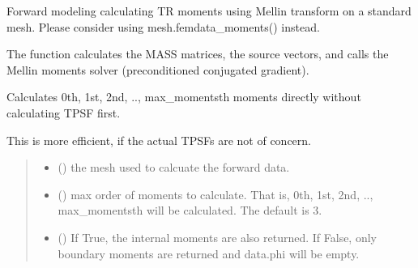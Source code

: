 \documentclass[letterpaper,10pt,english]{sphinxmanual}
\begin{document}
\begin{fulllineitems}
\label{\detokenize{_autosummary/nirfasterff.forward.femdata.femdata_stnd_TR_moments:nirfasterff.forward.femdata.femdata_stnd_TR_moments}}
\pysigstartsignatures
{}
\pysigstopsignatures
\sphinxAtStartPar
Forward modeling calculating TR moments using Mellin transform on a standard mesh. Please consider using mesh.femdata\_moments() instead.

\sphinxAtStartPar
The function calculates the MASS matrices, the source vectors, and calls the Mellin moments solver (preconditioned conjugated gradient).

\sphinxAtStartPar
Calculates 0th, 1st, 2nd, .., max\_moments\sphinxhyphen{}th moments directly without calculating TPSF first.

\sphinxAtStartPar
This is more efficient, if the actual TPSFs are not of concern.
\begin{quote}\begin{description}
\begin{itemize}
\item {} 
\sphinxAtStartPar
{} () \textendash{} the mesh used to calcuate the forward data.

\item {} 
\sphinxAtStartPar
{} (\sphinxstyleliteralemphasis{\sphinxupquote{, }}) \textendash{} max order of moments to calculate. That is, 0th, 1st, 2nd, .., max\_moments\sphinxhyphen{}th will be calculated. The default is 3.

\item {} 
\sphinxAtStartPar
{} (\sphinxstyleliteralemphasis{\sphinxupquote{, }}) \textendash{} 
\sphinxAtStartPar
If True, the internal moments are also returned. If False, only boundary moments are returned and data.phi will be empty.


\end{itemize}
\end{description}
\end{quote}
\end{fulllineitems}
\end{document}
